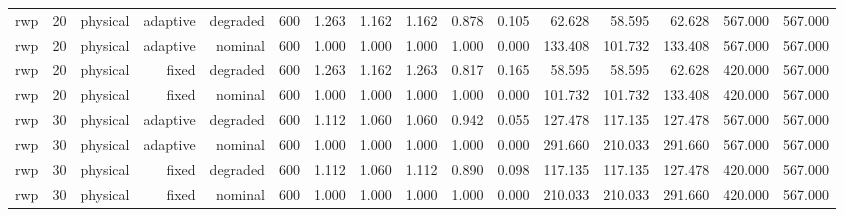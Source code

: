 \begin{tabular}{lrrrrrrrrrrrrrrr}
rwp & 20 & physical & adaptive & degraded & 600 & 1.263 & 1.162 & 1.162 & 0.878 & 0.105 & 62.628 & 58.595 & 62.628 & 567.000 & 567.000 \\
rwp & 20 & physical & adaptive & nominal & 600 & 1.000 & 1.000 & 1.000 & 1.000 & 0.000 & 133.408 & 101.732 & 133.408 & 567.000 & 567.000 \\
rwp & 20 & physical & fixed & degraded & 600 & 1.263 & 1.162 & 1.263 & 0.817 & 0.165 & 58.595 & 58.595 & 62.628 & 420.000 & 567.000 \\
rwp & 20 & physical & fixed & nominal & 600 & 1.000 & 1.000 & 1.000 & 1.000 & 0.000 & 101.732 & 101.732 & 133.408 & 420.000 & 567.000 \\
rwp & 30 & physical & adaptive & degraded & 600 & 1.112 & 1.060 & 1.060 & 0.942 & 0.055 & 127.478 & 117.135 & 127.478 & 567.000 & 567.000 \\
rwp & 30 & physical & adaptive & nominal & 600 & 1.000 & 1.000 & 1.000 & 1.000 & 0.000 & 291.660 & 210.033 & 291.660 & 567.000 & 567.000 \\
rwp & 30 & physical & fixed & degraded & 600 & 1.112 & 1.060 & 1.112 & 0.890 & 0.098 & 117.135 & 117.135 & 127.478 & 420.000 & 567.000 \\
rwp & 30 & physical & fixed & nominal & 600 & 1.000 & 1.000 & 1.000 & 1.000 & 0.000 & 210.033 & 210.033 & 291.660 & 420.000 & 567.000 \\
\bottomrule
\end{tabular}